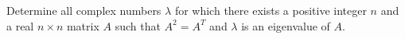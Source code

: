 Determine all complex numbers \(\lambda\) for which there exists a positive integer \(n\) and a real \(n\times n\) matrix \(A\) such that \(A^2=A^T\) and \(\lambda\) is an eigenvalue of \(A\).